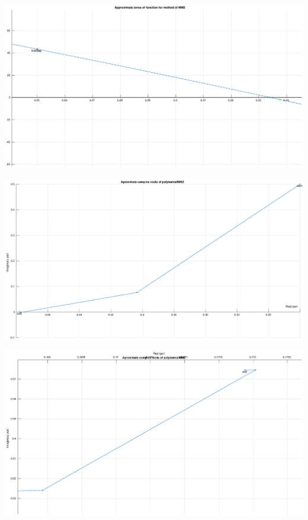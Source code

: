 \documentclass[12pt]{report}
\begin{document}
\begin{center}
   \includegraphics[scale=0.25]{task2mm2realright.eps}
\end{center}

\begin{center}
   \includegraphics[scale=0.25]{task2mm2complexoverall.eps}
\end{center}

\begin{center}
   \includegraphics[scale=0.25]{task2mm2complexright.eps}
\end{center}
\end{document}
